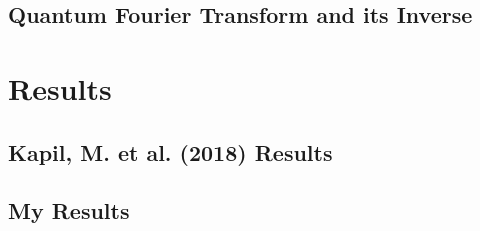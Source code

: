 \documentclass{article}
\begin{document}
\subsection{Quantum Fourier Transform and its Inverse}


\section{Results}
\subsection{Kapil, M. et al. (2018) Results}

\subsection{My Results}




\end{document}
